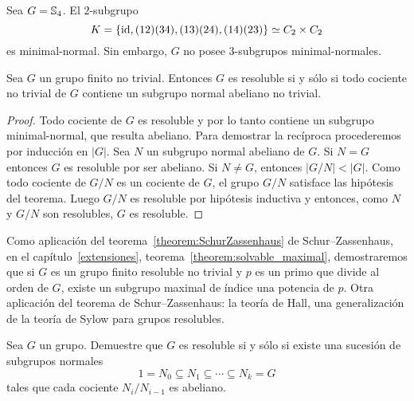 \begin{example}
	Sea $G=\mathbb{S}_4$. El $2$-subgrupo 
	\[
	K=\{\operatorname{id},(12)(34),(13)(24),(14)(23)\}\simeq
	C_2\times C_2
	\]
	es minimal-normal. Sin embargo, $G$ no posee $3$-subgrupos
	minimal-normales. 
\end{example}

\begin{theorem}
	Sea $G$ un grupo finito no trivial. Entonces $G$ es resoluble si y sólo si
	todo cociente no trivial de $G$ contiene un subgrupo normal abeliano no
	trivial.
\end{theorem}

\begin{proof}
	Todo cociente de $G$ es resoluble y por lo tanto contiene un subgrupo
	minimal-normal, que resulta abeliano. Para demostrar la recíproca
	procederemos por inducción en $|G|$. Sea $N$ un subgrupo normal abeliano de
	$G$. Si $N=G$ entonces $G$ es resoluble por ser abeliano. Si $N\ne G$,
	entonces $|G/N|<|G|$. Como todo cociente de $G/N$ es un cociente de $G$, el
	grupo $G/N$ satisface las hipótesis del teorema. Luego $G/N$ es resoluble
	por hipótesis inductiva y entonces, como $N$ y $G/N$ son resolubles, $G$ es
	resoluble.
\end{proof}

Como aplicación del teorema~\ref{theorem:SchurZassenhaus} de
Schur--Zassenhaus, en el capítulo~\ref{extensiones},
teorema~\ref{theorem:solvable_maximal}, demostraremos que si $G$ es un
grupo finito resoluble no trivial y $p$ es un primo que divide al orden de
$G$, existe un subgrupo maximal de índice una potencia de $p$. 
Otra aplicación del teorema de Schur--Zassenhaus: la teoría de Hall, 
una generalización de
la teoría de Sylow para grupos resolubles. 

\begin{exercise}
	\label{exercise:resoluble}
	Sea $G$ un grupo.  Demuestre que $G$ es resoluble si y sólo si existe una
	sucesión de subgrupos normales
	\[
		1=N_0\subseteq N_1\subseteq\cdots\subseteq N_k=G
	\]
	tales que cada cociente $N_i/N_{i-1}$ es abeliano.
\end{exercise}



